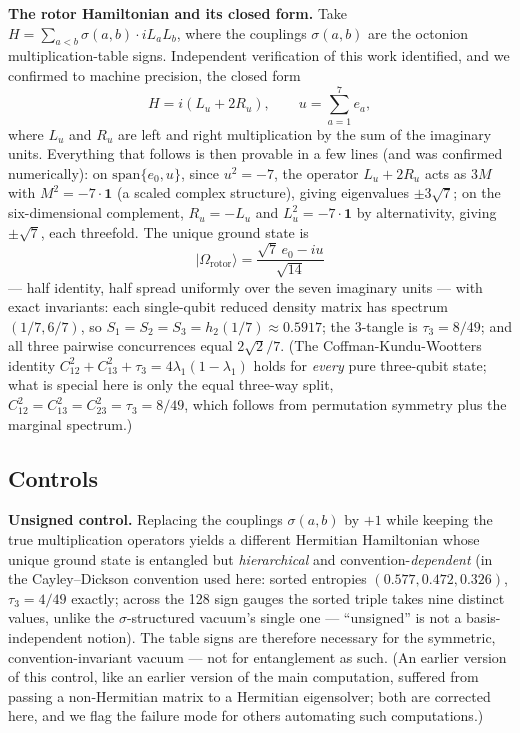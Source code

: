 \documentclass[11pt]{article}
\begin{document}
\textbf{The rotor Hamiltonian and its closed form.} Take $H = \sum_{a<b} \sigma(a,b) \cdot iL_aL_b$, where the couplings $\sigma(a,b)$ are the octonion multiplication-table signs. Independent verification of this work identified, and we confirmed to machine precision, the closed form
\[
H = i(L_u + 2R_u), \qquad u = \sum_{a=1}^{7} e_a,
\]
where $L_u$ and $R_u$ are left and right multiplication by the sum of the imaginary units. Everything that follows is then provable in a few lines (and was confirmed numerically): on $\mathrm{span}\{e_0, u\}$, since $u^2 = -7$, the operator $L_u + 2R_u$ acts as $3M$ with $M^2 = -7\cdot\mathbf{1}$ (a scaled complex structure), giving eigenvalues $\pm 3\sqrt{7}$; on the six-dimensional complement, $R_u = -L_u$ and $L_u^2 = -7\cdot\mathbf{1}$ by alternativity, giving $\pm\sqrt{7}$, each threefold. The unique ground state is
\[
|\Omega_{\mathrm{rotor}}\rangle = \frac{\sqrt{7}\,e_0 - iu}{\sqrt{14}}
\]
--- half identity, half spread uniformly over the seven imaginary units --- with exact invariants: each single-qubit reduced density matrix has spectrum $(1/7, 6/7)$, so $S_1 = S_2 = S_3 = h_2(1/7) \approx 0.5917$; the 3-tangle is $\tau_3 = 8/49$; and all three pairwise concurrences equal $2\sqrt{2}/7$. (The Coffman-Kundu-Wootters identity \cite{coffman} $C_{12}^2 + C_{13}^2 + \tau_3 = 4\lambda_1(1-\lambda_1)$ holds for \emph{every} pure three-qubit state; what is special here is only the equal three-way split, $C_{12}^2 = C_{13}^2 = C_{23}^2 = \tau_3 = 8/49$, which follows from permutation symmetry plus the marginal spectrum.)

\subsection{Controls}
\label{sec:rotorcontrols}

\textbf{Unsigned control.} Replacing the couplings $\sigma(a,b)$ by $+1$ while keeping the true multiplication operators yields a different Hermitian Hamiltonian whose unique ground state is entangled but \emph{hierarchical} and convention-\emph{dependent} (in the Cayley--Dickson convention used here: sorted entropies $(0.577, 0.472, 0.326)$, $\tau_3 = 4/49$ exactly; across the 128 sign gauges the sorted triple takes nine distinct values, unlike the $\sigma$-structured vacuum's single one --- ``unsigned'' is not a basis-independent notion). The table signs are therefore necessary for the symmetric, convention-invariant vacuum --- not for entanglement as such. (An earlier version of this control, like an earlier version of the main computation, suffered from passing a non-Hermitian matrix to a Hermitian eigensolver; both are corrected here, and we flag the failure mode for others automating such computations.)
\end{document}
